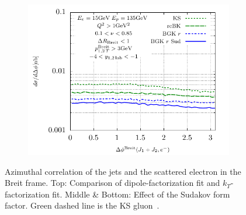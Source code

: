\documentclass[12pt]{article}
\numberwithin{equation}{section}
\numberwithin{table}{section}
\numberwithin{figure}{section}
\begin{document}
\begin{figure}[p]
\begin{subfigure}{0.5\textwidth}
	\end{subfigure}
	\begin{subfigure}{0.5\textwidth}
	\includegraphics[width=\textwidth]{plots/plotBGK3}
	\end{subfigure}
	\caption{\footnotesize Azimuthal correlation of the jets and the scattered electron in the Breit frame. Top: Comparison of dipole-factorization fit and $k_T$-factorization fit. Middle \& Bottom: Effect of the Sudakov form factor.   Green dashed line is the KS gluon~\cite{vanHameren:2021sqc}.}
	\label{fig:je-breit}
\end{figure}
\end{document}
